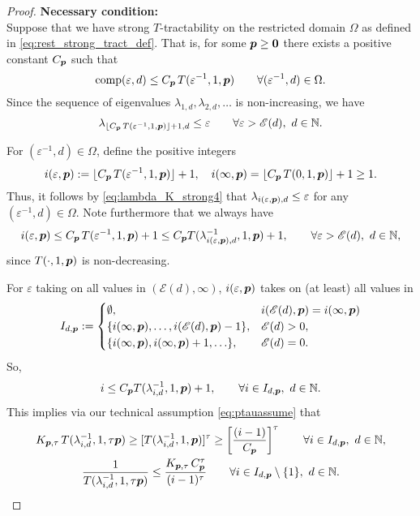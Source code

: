 \documentclass[sort&compress]{elsarticle}
\newcommand{\theM}{\mathscr{E}}
\newcommand{\peter}[1]{\begingroup\color{violet}#1\endgroup}
\begin{document}
\begin{proof}
\bigskip
\noindent \textbf{Necessary condition:} \\
Suppose that we have strong
$T$-tractability on the restricted domain $\Omega$ as defined in \eqref{eq:rest_strong_tract_def}. That is, for some $\boldsymbol{p} \ge \boldsymbol{0}$ there exists a positive constant $C_{\boldsymbol{p}}$ such that
\[
\operatorname{comp}(\varepsilon,d)\le C_{\boldsymbol{p}}\, T(\varepsilon^{-1},1,\boldsymbol{p})
\qquad \forall (\varepsilon^{-1}, d) \in \Omega.
\]
Since the sequence of eigenvalues $\lambda_{1,d}, \lambda_{2,d}, \ldots $ is non-increasing, we have
\begin{equation}\label{eq:lambda_K_strong4}
\lambda_{\lfloor C_{\vp}\, T(\varepsilon^{-1},1,\vp)\rfloor +1,d}\le \varepsilon \qquad \forall \varepsilon > \theM(d), \ d \in \mathbb{N}.
\end{equation}

For $(\varepsilon^{-1}, d) \in \Omega$, define the positive integers
\[
i(\varepsilon,\boldsymbol{p}):= \lfloor C_{\boldsymbol{p}}\, T(\varepsilon^{-1},1,\boldsymbol{p})\rfloor +1, \quad
i(\infty,\boldsymbol{p}) =  \lfloor C_{\boldsymbol{p}}\, T(0,1,\boldsymbol{p})\rfloor +1 \ge 1 . 
\]
Thus, it follows by \peter{\eqref{eq:lambda_K_strong4}} that $\lambda_{i(\varepsilon,\boldsymbol{p}),d} \le \varepsilon$
for any  $(\varepsilon^{-1}, d) \in \Omega$.
Note furthermore that we always have
\[
i(\varepsilon,\vp)\le C_{\vp}\, T(\varepsilon^{-1},1,\vp)+1 \le C_{\vp} T(\lambda_{i(\varepsilon,\vp),d}^{-1},1,\vp)+1, \qquad  \forall \varepsilon > \theM(d), \ d \in \mathbb{N},
\]
since
$T(\cdot,1, \boldsymbol{p})$ is non-decreasing.

For $\varepsilon$ taking on all values in $(\theM(d),\infty)$, $i(\varepsilon,\boldsymbol{p})$ takes on (at least) all values in
\[
I_{d,\vp}:=\begin{cases} 
\emptyset, & i(\theM(d),\vp) = i(\infty,\vp) \\
\{i(\infty,\vp),\ldots, i(\theM(d),\vp)-1\}, & \theM(d) > 0, \\
\{i(\infty,\vp), i(\infty,\vp) + 1, \ldots\}, & \theM(d) = 0.
\end{cases}
\]
So,
\[
i\le  C_{\boldsymbol{p}} T(\lambda_{i,d}^{-1},1,\boldsymbol{p})+1, \qquad \forall i\in I_{d,\boldsymbol{p}},  \ d \in \mathbb{N}.
\]
This implies via our technical assumption \eqref{eq:ptauassume} that
\begin{gather}
\nonumber
 K_{\boldsymbol{p},\tau}\,T (\lambda_{i,d}^{-1},1,\tau \boldsymbol{p}) \ge
 [T(\lambda_{i,d}^{-1},1, \boldsymbol{p})]^\tau
 \ge
  \left[\frac{(i-1)}{C_{\boldsymbol{p}}}\right]^\tau \qquad \forall i\in I_{d,\boldsymbol{p}},  \ d \in \mathbb{N}, \\
  \label{eq:rest_strong_ineq}
 \frac{1}{T (\lambda_{i,d}^{-1},1,\tau \boldsymbol{p})} \le
\frac{K_{\boldsymbol{p},\tau}\, C_{\boldsymbol{p}}^\tau}{(i-1)^\tau}\qquad \forall i \in I_{d,\boldsymbol{p}} \setminus\{1\}, \ d \in \mathbb{N} .
\end{gather}



\end{proof}
\end{document}
